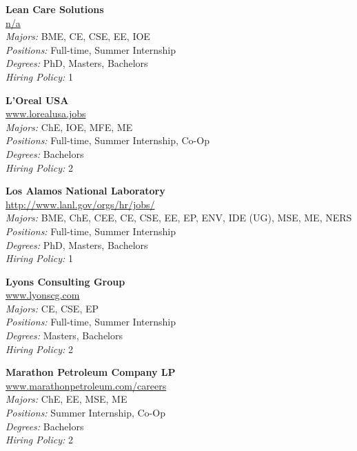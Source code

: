 \documentclass[twoside]{article}
\begin{document}
\begin{center}
\begin{multicols}{3}
\begin{minipage}{.9\columnwidth}{\Large\bf Lean Care Solutions }\\
	\url{n/a}\\
	\emph{Majors:} BME, CE, CSE, EE, IOE\\
	\emph{Positions:} Full-time, Summer Internship\\
	\emph{Degrees:} PhD, Masters, Bachelors\\
	\emph{Hiring Policy:} 1\\
\end{minipage}
 
\begin{minipage}{.9\columnwidth}{\Large\bf L'Oreal USA }\\
	\url{www.lorealusa.jobs}\\
	\emph{Majors:} ChE, IOE, MFE, ME\\
	\emph{Positions:} Full-time, Summer Internship, Co-Op\\
	\emph{Degrees:} Bachelors\\
	\emph{Hiring Policy:} 2\\
\end{minipage}
 
\begin{minipage}{.9\columnwidth}{\Large\bf Los Alamos National Laboratory }\\
	\url{http://www.lanl.gov/orgs/hr/jobs/}\\
	\emph{Majors:} BME, ChE, CEE, CE, CSE, EE, EP, ENV, IDE (UG), MSE, ME, NERS\\
	\emph{Positions:} Full-time, Summer Internship\\
	\emph{Degrees:} PhD, Masters, Bachelors\\
	\emph{Hiring Policy:} 1\\
\end{minipage}
 
\begin{minipage}{.9\columnwidth}{\Large\bf Lyons Consulting Group }\\
	\url{www.lyonscg.com}\\
	\emph{Majors:} CE, CSE, EP\\
	\emph{Positions:} Full-time, Summer Internship\\
	\emph{Degrees:} Masters, Bachelors\\
	\emph{Hiring Policy:} 2\\
\end{minipage}
 
\begin{minipage}{.9\columnwidth}{\Large\bf Marathon Petroleum Company LP }\\
	\url{www.marathonpetroleum.com/careers}\\
	\emph{Majors:} ChE, EE, MSE, ME\\
	\emph{Positions:} Summer Internship, Co-Op\\
	\emph{Degrees:} Bachelors\\
	\emph{Hiring Policy:} 2\\
\end{minipage}
 

\end{multicols}
\end{center}
\end{document}
